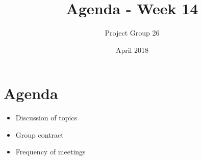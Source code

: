 \documentclass{article}
\title{Agenda - Week 14}
\author{Project Group 26}
\date{April 2018}
\begin{document}
\maketitle

\section{Agenda}

\begin{itemize}
    \item Discussion of topics
    \item Group contract
    \item Frequency of meetings
\end{itemize}
\end{document}
